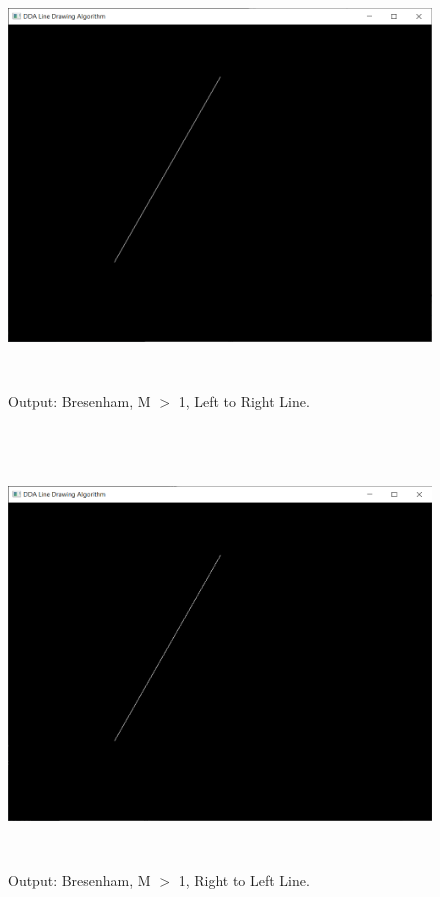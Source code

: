 \documentclass[12pt, a4]{article}
\begin{document}
\newpage
\subsection*{}
\begin{figure}[h]
\centering
\caption{Output: Bresenham, M $>$ 1, Left to Right Line.}
\includegraphics[height=11.25cm, width=15cm]{Outputs/3-Bresenham.png}
\end{figure}

\newpage
\subsection*{}
\begin{figure}[h]
\centering
\caption{Output: Bresenham, M $>$ 1, Right to Left Line.}
\includegraphics[height=11.25cm, width=15cm]{Outputs/4-Bresenham.png}
\end{figure}
\end{document}
